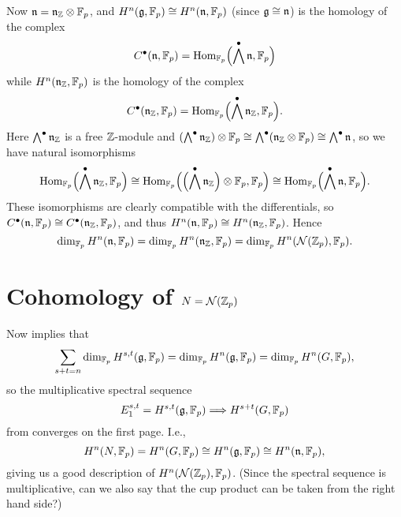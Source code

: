 Now $\mathfrak{n} = \mathfrak{n}_{\mathbb{Z}} \otimes \mathbb{F}_p$, and $H^n(\mathfrak{g},\mathbb{F}_p) \cong H^{n}(\mathfrak{n},\mathbb{F}_p)$ (since $\mathfrak{g} \cong \mathfrak{n}$) is the homology of the complex
\begin{equation*}
  C^\bullet(\mathfrak{n},\mathbb{F}_p) = \operatorname{Hom}_{\mathbb{F}_p}\Bigl( \bigwedge^\bullet \mathfrak{n},\mathbb{F}_p \Bigr)
\end{equation*}
while $H^{n}(\mathfrak{n}_{\mathbb{Z}},\mathbb{F}_p)$ is the homology of the complex
\begin{equation*}
  C^\bullet(\mathfrak{n}_{\mathbb{Z}},\mathbb{F}_p) = \operatorname{Hom}_{\mathbb{F}_p}\Bigl( \bigwedge^\bullet \mathfrak{n}_{\mathbb{Z}},\mathbb{F}_p \Bigr).
\end{equation*}
Here $\bigwedge^\bullet \mathfrak{n}_{\mathbb{Z}}$ is a free $\mathbb{Z}$-module and $(\bigwedge^\bullet \mathfrak{n}_{\mathbb{Z}}) \otimes \mathbb{F}_p \cong \bigwedge^\bullet (\mathfrak{n}_{\mathbb{Z}} \otimes \mathbb{F}_p) \cong \bigwedge^\bullet \mathfrak{n}$, so we have natural isomorphisms
\begin{equation*}
  \operatorname{Hom}_{\mathbb{F}_p}\Bigl( \bigwedge^\bullet \mathfrak{n}_{\mathbb{Z}},\mathbb{F}_p \Bigr) \cong \operatorname{Hom}_{\mathbb{F}_p}\Bigl( \Bigl( \bigwedge^\bullet \mathfrak{n}_{\mathbb{Z}} \Bigr) \otimes \mathbb{F}_p, \mathbb{F}_p \Bigr) \cong \operatorname{Hom}_{\mathbb{F}_p}\Bigl( \bigwedge^\bullet \mathfrak{n},\mathbb{F}_p \Bigr).
\end{equation*}
These isomorphisms are clearly compatible with the differentials, so $C^\bullet(\mathfrak{n},\mathbb{F}_p) \cong C^\bullet(\mathfrak{n}_{\mathbb{Z}},\mathbb{F}_p)$, and thus $H^n(\mathfrak{n},\mathbb{F}_p) \cong H^n(\mathfrak{n}_{\mathbb{Z}},\mathbb{F}_p)$. Hence
\begin{equation*}
  \dim_{\mathbb{F}_p} H^n(\mathfrak{n},\mathbb{F}_p) = \dim_{\mathbb{F}_p} H^n(\mathfrak{n}_{\mathbb{Z}},\mathbb{F}_p) = \dim_{\mathbb{F}_p} H^{n}(\mathcal{N}(\mathbb{Z}_p),\mathbb{F}_p).
\end{equation*}

\section{Cohomology of \texorpdfstring{$N=\mathcal{N}(\mathbb{Z}_p)$}{N=NZp}}

Now  implies that
\begin{equation*}
  \sum_{s+t = n} \dim_{\mathbb{F}_p} H^{s,t}(\mathfrak{g},\mathbb{F}_p) = \dim_{\mathbb{F}_p} H^n(\mathfrak{g},\mathbb{F}_p) = \dim_{\mathbb{F}_p} H^n(G,\mathbb{F}_p),
\end{equation*}
so the multiplicative spectral sequence
\begin{equation*}
  E_{1}^{s,t} = H^{s,t}(\mathfrak{g},\mathbb{F}_p) \Longrightarrow H^{s+t}(G,\mathbb{F}_p)
\end{equation*}
from  converges on the first page. I.e.,
\begin{equation*}
  H^n(N,\mathbb{F}_p) = H^n(G,\mathbb{F}_p) \cong H^n(\mathfrak{g},\mathbb{F}_p) \cong H^n(\mathfrak{n},\mathbb{F}_p),
\end{equation*}
giving us a good description of $H^n(\mathcal{N}(\mathbb{Z}_p),\mathbb{F}_p)$. (Since the spectral sequence is multiplicative, can we also say that the cup product can be taken from the right hand side?)
